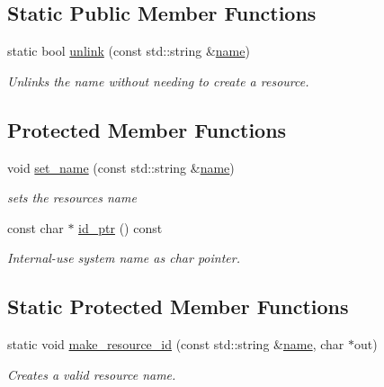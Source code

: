 \subsection*{Static Public Member Functions}
\begin{DoxyCompactItemize}
\item 
static bool \hyperlink{classcpen333_1_1process_1_1impl_1_1named__resource__base_a47a1396cf7c8210e76431a4ba4725146}{unlink} (const std\+::string \&\hyperlink{classcpen333_1_1process_1_1impl_1_1named__resource__base_a53986a0a1dd26a3602b842c45613b79d}{name})
\begin{DoxyCompactList}\small\item\em Unlinks the name without needing to create a resource. \end{DoxyCompactList}\end{DoxyCompactItemize}
\subsection*{Protected Member Functions}
\begin{DoxyCompactItemize}
\item 
void \hyperlink{classcpen333_1_1process_1_1impl_1_1named__resource__base_a46b07755d096da7295f6ba34355fad24}{set\+\_\+name} (const std\+::string \&\hyperlink{classcpen333_1_1process_1_1impl_1_1named__resource__base_a53986a0a1dd26a3602b842c45613b79d}{name})
\begin{DoxyCompactList}\small\item\em set\textquotesingle{}s the resource\textquotesingle{}s name \end{DoxyCompactList}\item 
const char $\ast$ \hyperlink{classcpen333_1_1process_1_1impl_1_1named__resource__base_a5291429a27070d875ca68bbf0a372842}{id\+\_\+ptr} () const
\begin{DoxyCompactList}\small\item\em Internal-\/use system name as char pointer. \end{DoxyCompactList}\end{DoxyCompactItemize}
\subsection*{Static Protected Member Functions}
\begin{DoxyCompactItemize}
\item 
static void \hyperlink{classcpen333_1_1process_1_1impl_1_1named__resource__base_a05acacbbb9c61cef11290c5e57432e18}{make\+\_\+resource\+\_\+id} (const std\+::string \&\hyperlink{classcpen333_1_1process_1_1impl_1_1named__resource__base_a53986a0a1dd26a3602b842c45613b79d}{name}, char $\ast$out)
\begin{DoxyCompactList}\small\item\em Creates a valid resource name. \end{DoxyCompactList}\end{DoxyCompactItemize}


